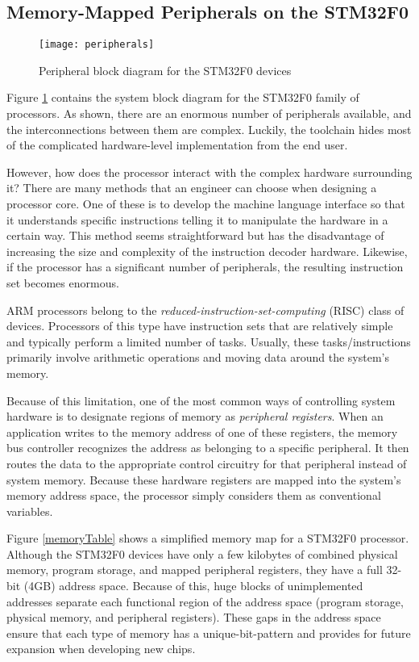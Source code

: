 \documentclass[11pt,fleqn]{book} %
\begin{document}
\subsection{Memory-Mapped Peripherals on the STM32F0}

\begin{figure}[]
    \centering\texttt{[image: peripherals]}
    \caption{Peripheral block diagram for the STM32F0 devices}
    \label{peripherals}
\end{figure}

Figure \ref{peripherals} contains the system block diagram for the STM32F0 family of processors. As shown, there are an enormous number of peripherals available, and the interconnections between them are complex. Luckily, the toolchain hides most of the complicated hardware-level implementation from the end user.

However, how does the processor interact with the complex hardware surrounding it? There are many methods that an engineer can choose when designing a processor core. One of these is to develop the machine language interface so that it understands specific instructions telling it to manipulate the hardware in a certain way. This method seems straightforward but has the disadvantage of increasing the size and complexity of the instruction decoder hardware. Likewise, if the processor has a significant number of peripherals, the resulting instruction set becomes enormous. 

ARM processors belong to the \textit{reduced-instruction-set-computing} (RISC) class of devices. Processors of this type have instruction sets that are relatively simple and typically perform a limited number of tasks. Usually, these tasks/instructions primarily involve arithmetic operations and moving data around the system's memory.

Because of this limitation, one of the most common ways of controlling system hardware is to designate regions of memory as \textit{peripheral registers}. When an application writes to the memory address of one of these registers, the memory bus controller recognizes the address as belonging to a specific peripheral. It then routes the data to the appropriate control circuitry for that peripheral instead of system memory. Because these hardware registers are mapped into the system's memory address space, the processor simply considers them as conventional variables. 

Figure \ref{memoryTable} shows a simplified memory map for a STM32F0 processor. Although the STM32F0 devices have only a few kilobytes of combined physical memory, program storage, and mapped peripheral registers, they have a full 32-bit (4GB) address space. Because of this, huge blocks of unimplemented addresses separate each functional region of the address space (program storage, physical memory, and peripheral registers). These gaps in the address space ensure that each type of memory has a unique-bit-pattern and provides for future expansion when developing new chips. 
\end{document}

